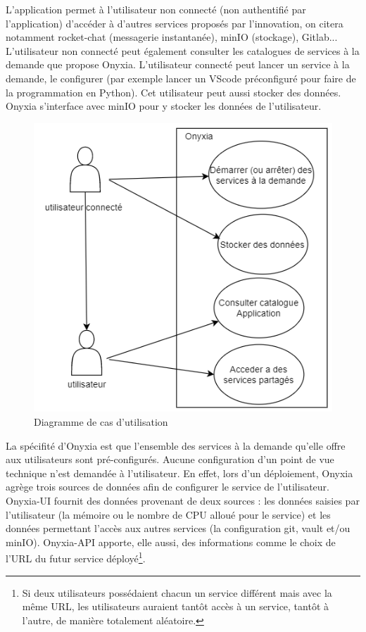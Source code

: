 \documentclass[11pt,fleqn]{book} %
\begin{document}
L'application permet à l'utilisateur non connecté (non authentifié par l'application) d'accéder à d'autres services proposés par l'innovation, on citera notamment rocket-chat (messagerie instantanée), minIO (stockage), Gitlab... L'utilisateur non connecté peut également consulter les catalogues de services à la demande que propose Onyxia. L'utilisateur connecté peut lancer un service à la demande, le configurer (par exemple lancer un VScode préconfiguré pour faire de la programmation en Python). Cet utilisateur peut aussi stocker des données. Onyxia s'interface avec minIO pour y stocker les données de l'utilisateur.\\
\begin{figure}
    \renewcommand{\figurename}{Diagramme}
    \includegraphics[scale=0.7]{Pictures/onyxia/onyxia-cu.PNG}
    \caption[]{Diagramme de cas d'utilisation \newline}
\end{figure}

La spécifité d'Onyxia est que l'ensemble des services à la demande qu'elle offre aux utilisateurs sont pré-configurés. Aucune configuration d'un point de vue technique n'est demandée à l'utilisateur. En effet, lors d'un déploiement, Onyxia agrège trois sources de données afin de configurer le service de l'utilisateur. \\

Onyxia-UI fournit des données provenant de deux sources : les données saisies par l'utilisateur (la mémoire ou le nombre de CPU alloué pour le service) et les données permettant l'accès aux autres services (la configuration git, vault et/ou minIO). Onyxia-API apporte, elle aussi, des informations comme le choix de l'URL du futur service déployé\footnote{Si deux utilisateurs possédaient chacun un service différent mais avec la même URL, les utilisateurs auraient tantôt accès à un service, tantôt à l'autre, de manière totalement aléatoire.}.\\
\end{document}
